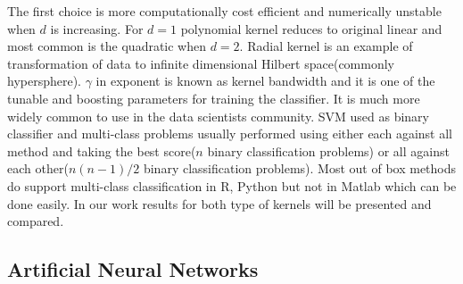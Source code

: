 The first choice is more computationally cost efficient and numerically unstable when $d$ is increasing. For $d=1$ polynomial kernel reduces to original linear and most common is the quadratic when $d=2$. Radial kernel is an example of transformation of data to infinite dimensional Hilbert space(commonly hypersphere). $\gamma$ in exponent is known as kernel bandwidth and it is one of the tunable and boosting parameters for training the classifier. It is much more widely common to use in the data scientists community. SVM used as binary classifier and multi-class problems usually performed using either each against all method and taking the best score($n$ binary classification problems) or all against each other($n(n-1)/2$ binary classification problems). Most out of box methods do support multi-class classification in R, Python but not in Matlab which can be done easily.  In our work results for both type of kernels will be presented and compared.           
\clearpage
\subsection{Artificial Neural Networks}
